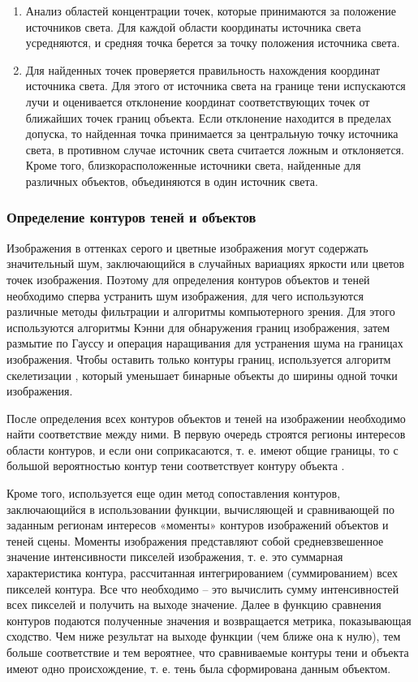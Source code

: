\begin{enumerate}
	\item Анализ областей концентрации точек, которые принимаются за положение источников света. Для каждой области координаты источника света усредняются, и средняя точка берется за точку положения источника света.
	\item Для найденных точек проверяется правильность нахождения координат источника света. Для этого от источника света на границе тени испускаются лучи и оценивается отклонение координат соответствующих точек от ближайших точек границ объекта. Если отклонение находится в пределах допуска, то найденная точка принимается за центральную точку источника света, в противном случае источник света считается ложным и отклоняется. Кроме того, близкорасположенные источники света, найденные для различных объектов, объединяются в один источник света.
\end{enumerate}

\subsubsection*{Определение контуров теней и объектов}

Изображения в оттенках серого и цветные изображения могут содержать значительный шум, заключающийся в случайных вариациях яркости или цветов точек изображения. Поэтому для определения контуров объектов и теней необходимо сперва устранить шум изображения, для чего используются различные методы фильтрации и алгоритмы компьютерного зрения. Для этого используются алгоритмы Кэнни \cite{canedgedetect} для обнаружения границ изображения, затем размытие по Гауссу \cite{gaus_smooth} и операция наращивания \cite{dilation} для устранения шума на границах изображения. Чтобы оставить только контуры границ, используется алгоритм скелетизации \cite{skeleton}, который уменьшает бинарные объекты до ширины одной точки изображения. 

После определения всех контуров объектов и теней на изображении необходимо найти соответствие между ними. В первую очередь строятся регионы интересов \cite{roi} области контуров, и если они соприкасаются, т. е. имеют общие границы, то с большой вероятностью контур тени соответствует контуру объекта \cite{sns_tras}.

Кроме того, используется еще один метод сопоставления контуров, заключающийся в использовании функции, вычисляющей и сравнивающей по заданным регионам интересов «моменты» контуров изображений объектов и теней сцены. Моменты изображения представляют собой средневзвешенное значение интенсивности пикселей изображения, т. е. это суммарная характеристика контура, рассчитанная интегрированием (суммированием) всех пикселей контура. Все что необходимо -- это вычислить сумму интенсивностей всех пикселей и получить на выходе значение. Далее в функцию сравнения контуров подаются полученные значения и возвращается метрика, показывающая сходство. Чем ниже результат на выходе функции (чем ближе она к нулю), тем больше соответствие и тем вероятнее, что сравниваемые контуры тени и объекта имеют одно происхождение, т. е. тень была сформирована данным объектом.

